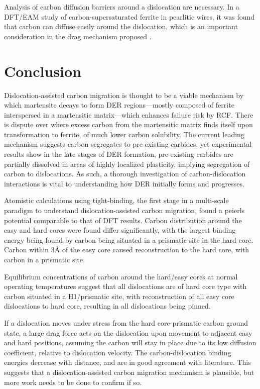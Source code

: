 \documentclass[a4paper,11pt]{article}
\begin{document}
Analysis of carbon diffusion barriers around a dislocation are necessary. In a DFT/EAM
study of carbon-supersaturated ferrite in pearlitic wires, it was found that carbon can diffuse
easily around the dislocation, which is an important consideration in the drag mechanism proposed
\cite{Nematollahi2016}.

\section{Conclusion}
\label{sec:org8442214}

Dislocation-assisted carbon migration is thought to be a viable mechanism by which martensite
decays to form DER regions---mostly composed of ferrite interspersed in a martensitic
matrix---which enhances failure risk by RCF. There is dispute over where excess carbon from the
martensitic matrix finds itself upon transformation to ferrite, of much lower carbon
solubility. The current leading mechanism suggests carbon segregates to pre-existing carbides, yet
experimental results show in the late stages of DER formation, pre-existing carbides are partially
dissolved in areas of highly localized plasticity, implying segregation of carbon to
dislocations. As such, a thorough investigation of carbon-dislocation interactions is vital to
understanding how DER initially forms and progresses.

Atomistic calculations using tight-binding, the first stage in a multi-scale paradigm to understand
dislocation-assisted carbon migration, found a peierls potential comparable to that of DFT
results. Carbon distribution around the easy and hard cores were found differ significantly, with the largest
binding energy being found by carbon being situated in a prismatic site in the hard core. Carbon
within 3\AA{} of the easy core caused reconstruction to the hard core, with carbon in a prismatic
site.

Equilibrium concentrations of carbon around the hard/easy cores at normal operating temperatures
suggest that all dislocations are of hard core type with carbon situated in a H1/prismatic site, with
reconstruction of all easy core dislocations to hard core, resulting in all dislocations being
pinned.

If a dislocation moves under stress from the hard core-prismatic carbon ground state, a large drag
force acts on the dislocation upon movement to adjacent easy and hard positions, assuming the carbon
will stay in place due to its low diffusion coefficient, relative to dislocation velocity. The
carbon-dislocation binding energies decrease with distance, and are in good agreement with
literature. This suggests that a dislocation-assisted carbon migration mechanism is plausible, but
more work needs to be done to confirm if so.
\end{document}
